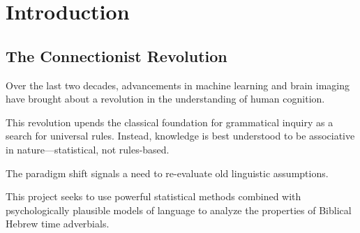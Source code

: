 
\chapter{Introduction}  %




\section{The Connectionist Revolution}

Over the last two decades, advancements in machine learning and brain imaging
have brought about a revolution in the understanding of human cognition.

This revolution upends the classical foundation for grammatical inquiry as a 
search for universal rules. Instead, knowledge is best understood to be associative
in nature—statistical, not rules-based. 

The paradigm shift signals a need to re-evaluate old linguistic assumptions.

This project seeks to use powerful statistical methods combined with psychologically
plausible models of language to analyze the properties of Biblical Hebrew time adverbials.